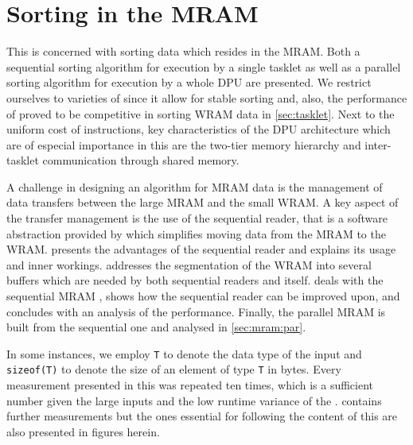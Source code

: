 \chapter[Sorting in the \texorpdfstring{\abb{MRAM}}{MRAM}]{Sorting in the \acs*{MRAM}}
\label{sec:mram}

This  is concerned with sorting data which resides in the \ac{MRAM}.
Both a sequential sorting algorithm for execution by a single tasklet as well as a parallel sorting algorithm for execution by a whole \ac{DPU} are presented.
We restrict ourselves to varieties of \MS{} since it allow for stable sorting and, also, the performance of \MS{} proved to be competitive in sorting \ac{WRAM} data in \cref{sec:tasklet}.
Next to the uniform cost of instructions, key characteristics of the \ac{DPU} architecture which are of especial importance in this  are the two-tier memory hierarchy and inter-tasklet communication through shared memory.

A challenge in designing an algorithm for \ac{MRAM} data is the management of data transfers between the large \ac{MRAM} and the small \ac{WRAM}.
A key aspect of the transfer management is the use of the sequential reader, that is a software abstraction provided by \upmem{} which simplifies moving data from the \ac{MRAM} to the \ac{WRAM}.
 presents the advantages of the sequential reader and explains its usage and inner workings.
 addresses the segmentation of the \ac{WRAM} into several buffers which are needed by both sequential readers and \MS{} itself.
 deals with the sequential \ac{MRAM} \MS{}, shows how the sequential reader can be improved upon, and concludes with an analysis of the performance.
Finally, the parallel \ac{MRAM} \MS{} is built from the sequential one and analysed in \cref{sec:mram:par}.

In some instances, we employ \lstinline|T| to denote the data type of the input and \lstinline[keywords={}]|sizeof(T)| to denote the size of an element of type \lstinline|T| in bytes.
Every measurement presented in this  was repeated ten times, which is a sufficient number given the large inputs and the low runtime variance of the \MS*{}.
 contains further measurements but the ones essential for following the content of this  are also presented in figures herein.








